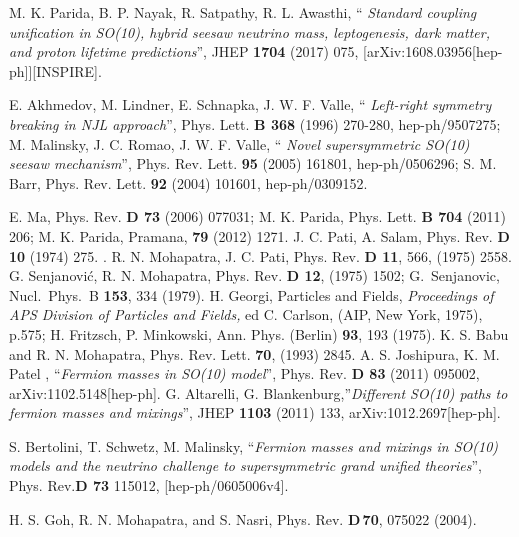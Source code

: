 \documentclass[a4paper,11pt]{article}
\begin{document}
\begin{thebibliography}{99}
M. K. Parida, B. P. Nayak, R. Satpathy, R. L. Awasthi, ``{\em
  Standard coupling unification in SO(10), hybrid seesaw neutrino mass,
  leptogenesis, dark matter, and proton lifetime predictions}'', 
  JHEP {\bf 1704} (2017) 075, [arXiv:1608.03956[hep-ph]][{\small IN}SPIRE].

 E. Akhmedov, M. Lindner, E. Schnapka, J. W. F. Valle,
  `` {\em Left-right symmetry breaking in NJL approach}'',
  Phys. Lett. {\bf B 368} (1996) 270-280, hep-ph/9507275; M. Malinsky,
  J. C. Romao, J. W. F. Valle, `` {\em  Novel supersymmetric SO(10) seesaw
mechanism}'', Phys. Rev. Lett. {\bf 95} (2005) 161801, hep-ph/0506296;
  S. M. Barr, Phys. Rev. Lett. {\bf 92} (2004) 101601, hep-ph/0309152. 
 
 E. Ma, Phys. Rev. {\bf D 73} (2006) 077031; 
 M. K. Parida, Phys. Lett. {\bf B 704} (2011) 206;
  M. K. Parida, Pramana, {\bf 79} (2012) 1271.  
 J. C. Pati, A. Salam, Phys. Rev. {\bf D 10} (1974) 275. 
. R. N. Mohapatra, J. C. Pati, Phys. Rev. {\bf D 11},
 566, (1975) 2558.
 G. Senjanovi\'c, R. N. Mohapatra, Phys. Rev.
{\bf D 12},  (1975)  1502; G.~Senjanovic,
  Nucl.\ Phys.\ B {\bf 153}, 334 (1979).
 H. Georgi, Particles and Fields, {\it Proceedings of APS
Division of Particles and Fields,} ed C. Carlson, (AIP, New York, 1975), p.575;
 H. Fritzsch, P. Minkowski, Ann. Phys. (Berlin) {\bf 93}, 193 (1975).
 K. S. Babu and R. N. Mohapatra,
  Phys. Rev. Lett. {\bf 70},  (1993) 2845.
 A. S. Joshipura, K. M. Patel , ``{\em Fermion
  masses in SO(10) model}'', Phys. Rev. {\bf D 83 } (2011) 095002,
  arXiv:1102.5148[hep-ph].
 G. Altarelli,
  G. Blankenburg,''{\em Different SO(10) paths to fermion masses and mixings}'',
  JHEP {\bf 1103} (2011) 133, arXiv:1012.2697[hep-ph].

  S. Bertolini, T. Schwetz, M. Malinsky, ``{\em Fermion masses and mixings in SO(10) models and the neutrino challenge to supersymmetric grand unified theories}'', Phys. Rev.{\bf D 73} 115012, [hep-ph/0605006v4].

 H. S. Goh, R. N. Mohapatra, and S. Nasri, Phys. Rev. {\bf D\,70}, 075022 (2004).


\end{thebibliography}
\end{document}
